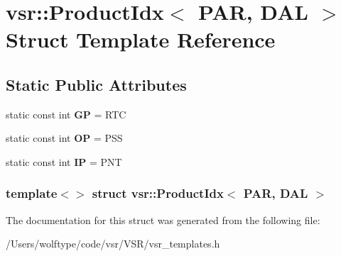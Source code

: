 \hypertarget{structvsr_1_1_product_idx_3_01_p_a_r_00_01_d_a_l_01_4}{\section{vsr\-:\-:Product\-Idx$<$ P\-A\-R, D\-A\-L $>$ Struct Template Reference}
\label{structvsr_1_1_product_idx_3_01_p_a_r_00_01_d_a_l_01_4}
}
\subsection*{Static Public Attributes}
\begin{DoxyCompactItemize}
\item 
\hypertarget{structvsr_1_1_product_idx_3_01_p_a_r_00_01_d_a_l_01_4_a96461585de9389492ecf5b29cd7e4d6b}{static const int {\bfseries G\-P} = R\-T\-C}\label{structvsr_1_1_product_idx_3_01_p_a_r_00_01_d_a_l_01_4_a96461585de9389492ecf5b29cd7e4d6b}

\item 
\hypertarget{structvsr_1_1_product_idx_3_01_p_a_r_00_01_d_a_l_01_4_a80dab222fc5aedcfd7228cb4a4037cf0}{static const int {\bfseries O\-P} = P\-S\-S}\label{structvsr_1_1_product_idx_3_01_p_a_r_00_01_d_a_l_01_4_a80dab222fc5aedcfd7228cb4a4037cf0}

\item 
\hypertarget{structvsr_1_1_product_idx_3_01_p_a_r_00_01_d_a_l_01_4_a3a455d691978f564dce68e2ef351978b}{static const int {\bfseries I\-P} = P\-N\-T}\label{structvsr_1_1_product_idx_3_01_p_a_r_00_01_d_a_l_01_4_a3a455d691978f564dce68e2ef351978b}

\end{DoxyCompactItemize}
\subsubsection*{template$<$$>$ struct vsr\-::\-Product\-Idx$<$ P\-A\-R, D\-A\-L $>$}



The documentation for this struct was generated from the following file\-:\begin{DoxyCompactItemize}
\item 
/\-Users/wolftype/code/vsr/\-V\-S\-R/vsr\-\_\-templates.\-h\end{DoxyCompactItemize}
